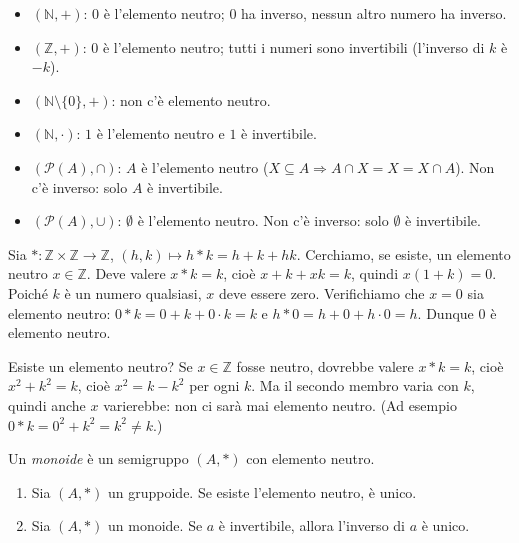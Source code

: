 \documentclass[11pt,a4paper]{article}
\begin{document}
\begin{esempio}
\begin{itemize}
  \item $(\mathbb{N}, +)$: $0$ è l'elemento neutro; $0$ ha inverso, nessun altro numero ha inverso.
  \item $(\mathbb{Z}, +)$: $0$ è l'elemento neutro; tutti i numeri sono invertibili (l'inverso di $k$ è $-k$).
  \item $(\mathbb{N}\setminus\{0\}, +)$: non c'è elemento neutro.
  \item $(\mathbb{N}, \cdot)$: $1$ è l'elemento neutro e $1$ è invertibile.
  \item $(\mathcal{P}(A), \cap)$: $A$ è l'elemento neutro ($X \subseteq A \Rightarrow A \cap X = X = X \cap A$). Non c'è inverso: solo $A$ è invertibile.
  \item $(\mathcal{P}(A), \cup)$: $\emptyset$ è l'elemento neutro. Non c'è inverso: solo $\emptyset$ è invertibile.
\end{itemize}
\end{esempio}

\begin{esempio}[$h * k = h + k + hk$ su $\mathbb{Z}$]
Sia $* : \mathbb{Z}\times\mathbb{Z} \to \mathbb{Z}$, $(h, k) \mapsto h * k = h + k + hk$. Cerchiamo, se esiste, un elemento neutro $x \in \mathbb{Z}$. Deve valere $x * k = k$, cioè $x + k + xk = k$, quindi $x(1 + k) = 0$. Poiché $k$ è un numero qualsiasi, $x$ deve essere zero. Verifichiamo che $x = 0$ sia elemento neutro: $0 * k = 0 + k + 0\cdot k = k$ e $h * 0 = h + 0 + h\cdot 0 = h$. Dunque $0$ è elemento neutro.
\end{esempio}

\begin{esempio}[$h * k = h^2 + k^2$ su $\mathbb{Z}$]
Esiste un elemento neutro? Se $x \in \mathbb{Z}$ fosse neutro, dovrebbe valere $x * k = k$, cioè $x^2 + k^2 = k$, cioè $x^2 = k - k^2$ per ogni $k$. Ma il secondo membro varia con $k$, quindi anche $x$ varierebbe: non ci sarà mai elemento neutro. (Ad esempio $0 * k = 0^2 + k^2 = k^2 \neq k$.)
\end{esempio}

\begin{definizione}[Monoide]
Un \emph{monoide} è un semigruppo $(A, *)$ con elemento neutro.
\end{definizione}

\begin{proposizione}
\begin{enumerate}
  \item Sia $(A, *)$ un gruppoide. Se esiste l'elemento neutro, è unico.
  \item Sia $(A, *)$ un monoide. Se $a$ è invertibile, allora l'inverso di $a$ è unico.
\end{enumerate}
\end{proposizione}
\end{document}
